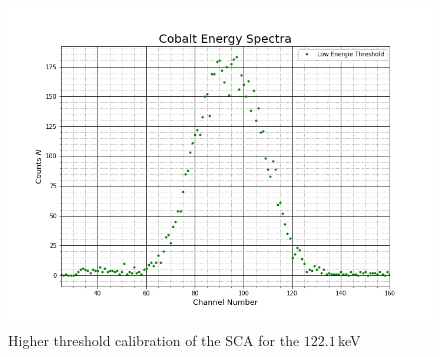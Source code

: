 \documentclass[30pt,a4paper]{article}
\begin{document}
	\begin{figure}
		\includegraphics[scale=0.5]{Bilder/LowThresh}
		\centering
		\caption{Higher threshold calibration of the SCA for the $122.1\,$keV}
		\label{high}
	\end{figure}
\end{document}
